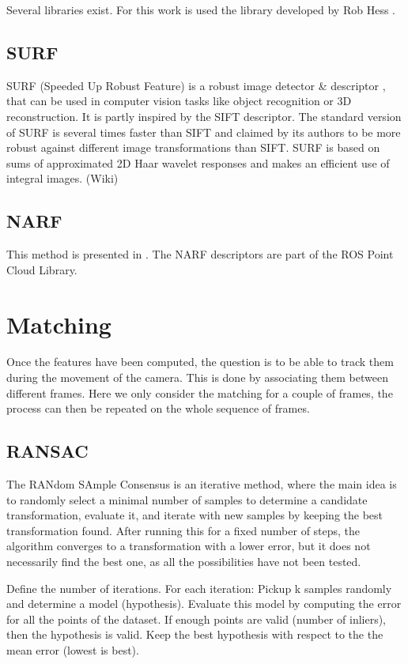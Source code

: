 Several libraries exist. For this work is used the library developed by Rob Hess \cite{hesssift}.

\subsection{SURF}
SURF (Speeded Up Robust Feature) is a robust image detector \& descriptor \cite{surf}, that can be used in computer vision tasks like object recognition or 3D reconstruction. It is partly inspired by the SIFT descriptor. The standard version of SURF is several times faster than SIFT and claimed by its authors to be more robust against different image transformations than SIFT. SURF is based on sums of approximated 2D Haar wavelet responses and makes an efficient use of integral images. (Wiki)

\subsection{NARF}
This method is presented in \cite{steder10irosws}. The NARF descriptors are part of the ROS Point Cloud Library.

\section{Matching}

Once the features have been computed, the question is to be able to track them during the movement of the camera. This is done by associating them between different frames. Here we only consider the matching for a couple of frames, the process can then be repeated on the whole sequence of frames.

\subsection{RANSAC}
The RANdom SAmple Consensus is an iterative method, where the main idea is to randomly select a minimal number of samples to determine a candidate transformation, evaluate it, and iterate with new samples by keeping the best transformation found. After running this for a fixed number of steps, the algorithm converges to a transformation with a lower error, but it does not necessarily find the best one, as all the possibilities have not been tested.

Define the number of iterations.
For each iteration:
Pickup k samples randomly and determine a model (hypothesis). Evaluate this model by computing the error for all the points of the dataset. If enough points are valid (number of inliers), then the hypothesis is valid. Keep the best hypothesis with respect to the the mean error (lowest is best).

